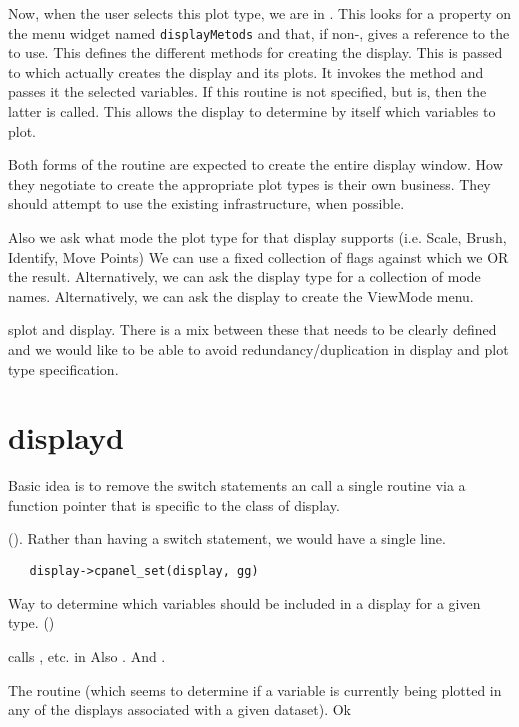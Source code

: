 \documentclass{article}
\begin{document}
Now, when the user selects this plot type, we are in
.  This looks for a property on the menu
widget named \texttt{displayMetods} and that, if non-\CNull, gives a
reference to the  to use.  This defines the
different methods for creating the display.  This is passed to
 which actually creates the display and its
plots.  It invokes the method  and
passes it the selected variables.  If this routine is not specified,
but  is, then the latter is called.  This
allows the display to determine by itself which variables to plot.

Both forms of the  routine are expected to
create the entire display window.  How they negotiate to create the
appropriate plot types is their own business. They should attempt to
use the existing infrastructure, when possible.


Also we ask what mode the plot type for that display supports
(i.e. Scale, Brush, Identify, Move Points) We can use a fixed
collection of flags against which we OR the result.  Alternatively, we
can ask the display type for a collection of mode names.
Alternatively, we can ask the display to create the ViewMode menu.

splot and display.  There is a mix between these that needs to be
clearly defined and we would like to be able to avoid
redundancy/duplication in display and plot type specification.


\section{displayd}
Basic idea is to remove the switch statements
an call a single routine via a function pointer
that is specific to the class of display.

 ().
Rather than having a switch statement, we would have
a single line.
\begin{verbatim}
   display->cpanel_set(display, gg)
\end{verbatim}

Way to determine which variables should be included in a display
for a given type. ()

 calls , etc.  in
Also .
And .


The routine  (which seems to determine
if a variable is currently being plotted in any of
the displays associated with a given dataset).
Ok 
\end{document}
